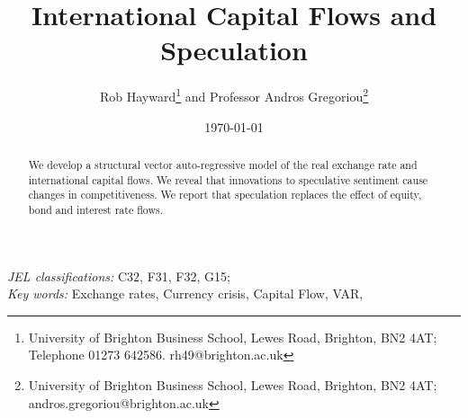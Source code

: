 \documentclass[12pt, a4paper, oneside]{article} %
\begin{document}
\title{International Capital Flows and Speculation}
\author{Rob Hayward\footnote{University of Brighton Business School, Lewes Road, Brighton, BN2 4AT; Telephone 01273 642586.  rh49@brighton.ac.uk} and Professor Andros Gregoriou\footnote{University of Brighton Business School, Lewes Road, Brighton, BN2 4AT; andros.gregoriou@brighton.ac.uk}} 
\date{\today}
\maketitle
  \begin{abstract}We develop a structural vector auto-regressive model of the real exchange rate and international capital flows. We reveal that innovations to speculative sentiment cause changes in competitiveness.  We report that speculation replaces the effect of equity, bond and interest rate flows.
\end{abstract}
\emph{JEL classifications:} C32, F31, F32, G15; \\
\emph{Key words:} Exchange rates, Currency crisis, Capital Flow, VAR, 
\end{document}
